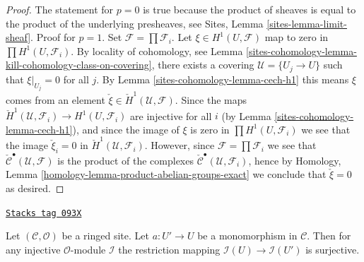 \begin{proof}
The statement for $p = 0$ is true because the product of sheaves
is equal to the product of the underlying presheaves, see
Sites, Lemma \ref{sites-lemma-limit-sheaf}.
Proof for $p = 1$. Set $\mathcal{F} = \prod \mathcal{F}_i$.
Let $\xi \in H^1(U, \mathcal{F})$ map to zero in
$\prod H^1(U, \mathcal{F}_i)$. By locality of cohomology, see
Lemma \ref{sites-cohomology-lemma-kill-cohomology-class-on-covering},
there exists a covering $\mathcal{U} = \{U_j \to U\}$ such that
$\xi|_{U_j} = 0$ for all $j$. By Lemma \ref{sites-cohomology-lemma-cech-h1} this means
$\xi$ comes from an element
$\check \xi \in \check H^1(\mathcal{U}, \mathcal{F})$.
Since the maps
$\check H^1(\mathcal{U}, \mathcal{F}_i) \to H^1(U, \mathcal{F}_i)$
are injective for all $i$ (by Lemma \ref{sites-cohomology-lemma-cech-h1}), and since
the image of $\xi$ is zero in $\prod H^1(U, \mathcal{F}_i)$ we see
that the image
$\check \xi_i = 0$ in $\check H^1(\mathcal{U}, \mathcal{F}_i)$.
However, since $\mathcal{F} = \prod \mathcal{F}_i$ we see that
$\check{\mathcal{C}}^\bullet(\mathcal{U}, \mathcal{F})$ is the
product of the complexes
$\check{\mathcal{C}}^\bullet(\mathcal{U}, \mathcal{F}_i)$,
hence by
Homology, Lemma \ref{homology-lemma-product-abelian-groups-exact}
we conclude that $\check \xi = 0$ as desired.
\end{proof}

\begin{lemma}
\label{sites-cohomology-lemma-restriction-along-monomorphism-surjective}
\href{https://stacks.math.columbia.edu/tag/093X}{\texttt{Stacks tag 093X}}

Let $(\mathcal{C}, \mathcal{O})$ be a ringed site. Let $a : U' \to U$ be a
monomorphism in $\mathcal{C}$. Then for any injective $\mathcal{O}$-module
$\mathcal{I}$ the restriction mapping $\mathcal{I}(U) \to \mathcal{I}(U')$
is surjective.
\end{lemma}

